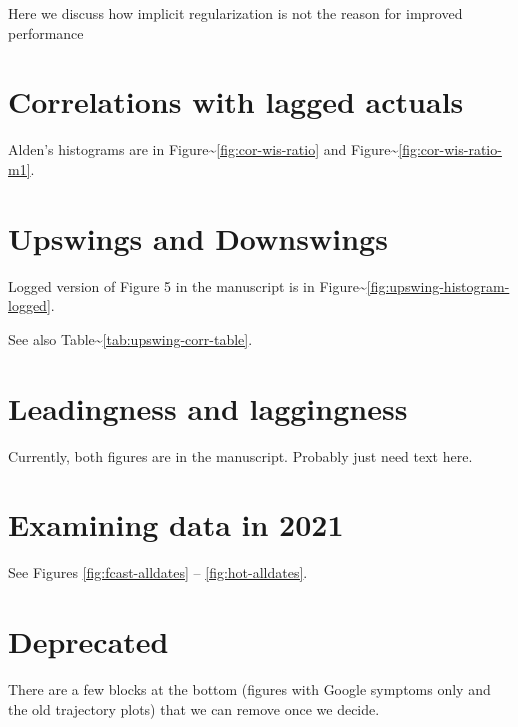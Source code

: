 \documentclass[9pt,twoside,lineno]{pnas-new}
\begin{document}
Here we discuss how implicit regularization is not the reason for
improved performance

\hypertarget{correlations-with-lagged-actuals}{%
\section{Correlations with lagged
actuals}\label{correlations-with-lagged-actuals}}

Alden's histograms are in Figure\textasciitilde{}\ref{fig:cor-wis-ratio}
and Figure\textasciitilde{}\ref{fig:cor-wis-ratio-m1}.

\hypertarget{upswings-and-downswings}{%
\section{Upswings and Downswings}\label{upswings-and-downswings}}

Logged version of Figure 5 in the manuscript is in
Figure\textasciitilde{}\ref{fig:upswing-histogram-logged}.

See also Table\textasciitilde{}\ref{tab:upswing-corr-table}.

\hypertarget{leadingness-and-laggingness}{%
\section{Leadingness and
laggingness}\label{leadingness-and-laggingness}}

Currently, both figures are in the manuscript. Probably just need text
here.

\hypertarget{examining-data-in-2021}{%
\section{Examining data in 2021}\label{examining-data-in-2021}}

See Figures \ref{fig:fcast-alldates} -- \ref{fig:hot-alldates}.

\hypertarget{deprecated}{%
\section{Deprecated}\label{deprecated}}

There are a few blocks at the bottom (figures with Google symptoms only
and the old trajectory plots) that we can remove once we decide.
\end{document}
